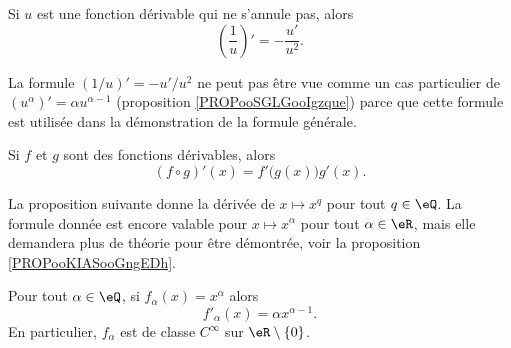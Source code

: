 \begin{proposition}        \label{PROPooMPSFooOASfDm}
    Si \( u\) est une fonction dérivable qui ne s'annule pas, alors
    \begin{equation}
        \left( \frac{1}{ u } \right)'=-\frac{ u' }{ u^2 }.
    \end{equation}
\end{proposition}

\begin{remark}
    La formule \( (1/u)'=-u'/u^2\) ne peut pas être vue comme un cas particulier de \( (u^{\alpha})'=\alpha u^{\alpha-1}\) (proposition \ref{PROPooSGLGooIgzque}) parce que cette formule est utilisée dans la démonstration de la formule générale.
\end{remark}

\begin{proposition}\label{PROPooXGBIooQuXguO}
    Si \( f\) et \( g\) sont des fonctions dérivables, alors
    \begin{equation}
        (f\circ g)'(x)=f'\big( g(x) \big)g'(x).
    \end{equation}
\end{proposition}

La proposition suivante donne la dérivée de \( x\mapsto x^q\) pour tout \( q\in \eQ\). La formule donnée est encore valable pour \( x\mapsto x^{\alpha}\) pour tout \( \alpha\in \eR\), mais elle demandera plus de théorie pour être démontrée, voir la proposition \ref{PROPooKIASooGngEDh}.
\begin{proposition}     \label{PROPooSGLGooIgzque}
    Pour tout \( \alpha\in \eQ\), si \( f_{\alpha}(x)=x^{\alpha}\) alors
    \begin{equation}
        f'_{\alpha}(x)=\alpha x^{\alpha-1}.
    \end{equation}
    En particulier, \( f_{\alpha}\) est de classe \(  C^{\infty}\) sur \( \eR\setminus\{ 0 \}\).
\end{proposition}

